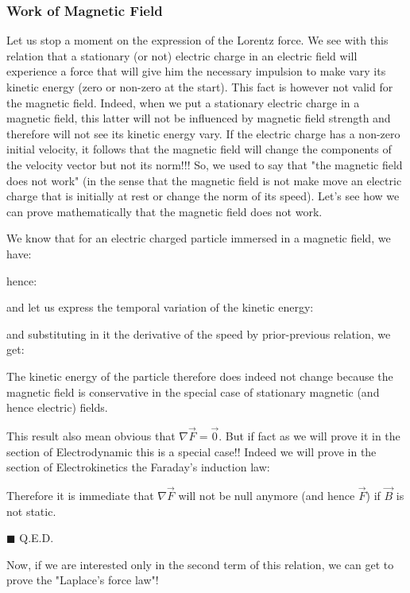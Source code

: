	\subsubsection{Work of Magnetic Field}
	Let us stop a moment on the expression of the Lorentz force. We see with this relation that a stationary (or not) electric charge in an electric field will experience a force that will give him the necessary impulsion to make vary its kinetic energy (zero or non-zero at the start). This fact is however not valid for the magnetic field. Indeed, when we put a stationary electric charge in a magnetic field, this latter will not be influenced by magnetic field strength and therefore will not see its kinetic energy vary. If the electric charge has a non-zero initial velocity, it follows that the magnetic field will change the components of the velocity vector but not its norm!!! So, we used to say that "the magnetic field does not work" (in the sense that the magnetic field is not make move an electric charge that is initially at rest or change the norm of its speed).
	Let's see how we can prove mathematically that the magnetic field does not work.
	\begin{dem}
	We know that for an electric charged particle immersed in a magnetic field, we have:
	
	hence:
	
	and let us express the temporal variation of the kinetic energy:
	
	and substituting in it the derivative of the speed by prior-previous relation, we get:
	
	The kinetic energy of the particle therefore does indeed not change because the magnetic field is conservative in the special case of stationary magnetic (and hence electric) fields.
	
	This result also mean obvious that $\nabla{\vec{F}}=\vec{0}$. But if fact as we will prove it in the section of Electrodynamic this is a special case!! Indeed we will prove in the section of Electrokinetics the Faraday's induction law:
	
	Therefore it is immediate that $\nabla{\vec{F}}$ will not be null anymore (and hence $\vec{F}$) if $\vec{B}$ is not static.
	\begin{flushright}
		$\blacksquare$  Q.E.D.
	\end{flushright}
	\end{dem}
	Now, if we are interested only in the second term of this relation, we can get to prove the "Laplace's force law"!

